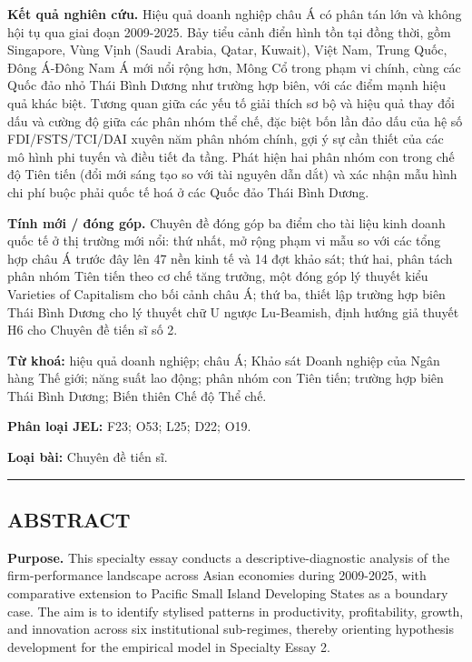 \documentclass[12pt,a4paper]{article}
\begin{document}
\textbf{Kết quả nghiên cứu.} Hiệu quả doanh nghiệp châu Á có phân tán
lớn và không hội tụ qua giai đoạn 2009-2025. Bảy tiểu cảnh điển hình tồn
tại đồng thời, gồm Singapore, Vùng Vịnh (Saudi Arabia, Qatar, Kuwait),
Việt Nam, Trung Quốc, Đông Á-Đông Nam Á mới nổi rộng hơn, Mông Cổ trong
phạm vi chính, cùng các Quốc đảo nhỏ Thái Bình Dương như trường hợp
biên, với các điểm mạnh hiệu quả khác biệt. Tương quan giữa các yếu tố
giải thích sơ bộ và hiệu quả thay đổi dấu và cường độ giữa các phân nhóm
thể chế, đặc biệt bốn lần đảo dấu của hệ số FDI/FSTS/TCI/DAI xuyên năm
phân nhóm chính, gợi ý sự cần thiết của các mô hình phi tuyến và điều
tiết đa tầng. Phát hiện hai phân nhóm con trong chế độ Tiên tiến (đổi
mới sáng tạo so với tài nguyên dẫn dắt) và xác nhận mẫu hình chi phí
buộc phải quốc tế hoá ở các Quốc đảo Thái Bình Dương.

\textbf{Tính mới / đóng góp.} Chuyên đề đóng góp ba điểm cho tài liệu
kinh doanh quốc tế ở thị trường mới nổi: thứ nhất, mở rộng phạm vi mẫu
so với các tổng hợp châu Á trước đây lên 47 nền kinh tế và 14 đợt khảo
sát; thứ hai, phân tách phân nhóm Tiên tiến theo cơ chế tăng trưởng, một
đóng góp lý thuyết kiểu Varieties of Capitalism cho bối cảnh châu Á; thứ
ba, thiết lập trường hợp biên Thái Bình Dương cho lý thuyết chữ U ngược
Lu-Beamish, định hướng giả thuyết H6 cho Chuyên đề tiến sĩ số 2.

\textbf{Từ khoá:} hiệu quả doanh nghiệp; châu Á; Khảo sát Doanh nghiệp
của Ngân hàng Thế giới; năng suất lao động; phân nhóm con Tiên tiến;
trường hợp biên Thái Bình Dương; Biến thiên Chế độ Thể chế.

\textbf{Phân loại JEL:} F23; O53; L25; D22; O19.

\textbf{Loại bài:} Chuyên đề tiến sĩ.

\begin{center}\rule{0.5\linewidth}{0.5pt}\end{center}

\hypertarget{abstract}{%
\subsection{ABSTRACT}\label{abstract}}

\textbf{Purpose.} This specialty essay conducts a descriptive-diagnostic
analysis of the firm-performance landscape across Asian economies during
2009-2025, with comparative extension to Pacific Small Island Developing
States as a boundary case. The aim is to identify stylised patterns in
productivity, profitability, growth, and innovation across six
institutional sub-regimes, thereby orienting hypothesis development for
the empirical model in Specialty Essay 2.
\end{document}
